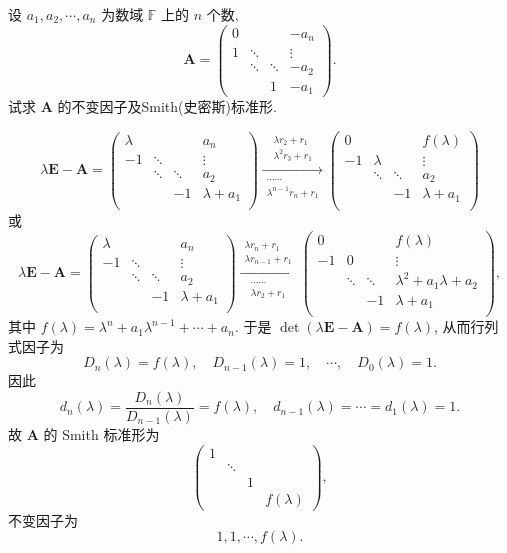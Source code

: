 \documentclass[../../main.tex]{subfiles}%
\begin{document}
\begin{example}
设 $a_1, a_2, \cdots, a_n$ 为数域 $\mathbb{F}$ 上的 $n$ 个数,
\[
\boldsymbol{A} = \begin{pmatrix} 
0 & & & -a_n \\
1 & \ddots & & \vdots \\
& \ddots & \ddots & -a_2 \\
& & 1 & -a_1 
\end{pmatrix}.
\]
试求 $\boldsymbol{A}$ 的不变因子及Smith(史密斯)标准形.
\end{example}
\begin{solution}
$$\lambda\boldsymbol{E}-\boldsymbol{A}=\begin{pmatrix}
\lambda& & & a_n\\
-1& \ddots& & \vdots\\
& \ddots& \ddots& a_2\\
& & -1& \lambda +a_1\\
\end{pmatrix}\xrightarrow[\substack{\cdots \cdots\\\lambda ^{n-1}r_n+r_1}]{\substack{\lambda r_2+r_1\\\lambda ^2r_3+r_1}}\begin{pmatrix}
0& & & f\left( \lambda \right)\\
-1& \lambda& & \vdots\\
& \ddots& \ddots& a_2\\
& & -1& \lambda +a_1\\
\end{pmatrix}$$
或
$$\lambda\boldsymbol{E}-\boldsymbol{A}=\begin{pmatrix}
\lambda& & & a_n\\
-1& \ddots& & \vdots\\
& \ddots& \ddots& a_2\\
& & -1& \lambda +a_1\\
\end{pmatrix}\xrightarrow[\substack{\cdots \cdots\\\lambda r_2+r_1}]{\substack{\lambda r_n+r_1\\\lambda r_{n-1}+r_1}}\begin{pmatrix}
0& & & f\left( \lambda \right)\\
-1& 0& & \vdots\\
& \ddots& \ddots& \lambda ^2+a_1\lambda +a_2\\
& & -1& \lambda +a_1\\
\end{pmatrix},$$
其中 $f(\lambda) = \lambda^n + a_1\lambda^{n-1} + \cdots + a_n$. 于是 $\det(\lambda\boldsymbol{E} - \boldsymbol{A}) = f(\lambda)$, 从而行列式因子为
\[
D_n(\lambda) = f(\lambda), \quad D_{n-1}(\lambda) = 1, \quad \cdots, \quad D_0(\lambda) = 1.
\]
因此
\[
d_n(\lambda) = \frac{D_n(\lambda)}{D_{n-1}(\lambda)} = f(\lambda), \quad d_{n-1}(\lambda) = \cdots = d_1(\lambda) = 1.
\]
故 $\boldsymbol{A}$ 的 Smith 标准形为
\[
\begin{pmatrix} 
1 & & & \\
& \ddots & & \\
& & 1 & \\
& & & f(\lambda) 
\end{pmatrix},
\]
不变因子为
\[
1, 1, \cdots, f(\lambda).
\]


\end{solution}
\end{document}
